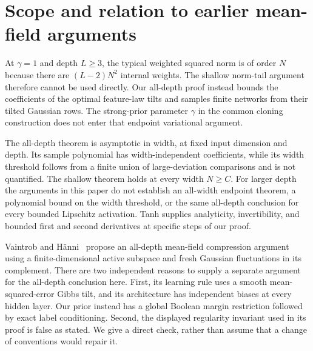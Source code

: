 \documentclass[11pt]{article}
\theoremstyle{remark}\newtheorem{remark}[theorem]{Remark}
\begin{document}
\section{Scope and relation to earlier mean-field arguments}
At $\gamma=1$ and depth $L\geq3$, the typical weighted squared norm is of
order $N$ because there are $(L-2)N^2$ internal weights. The shallow
norm-tail argument therefore cannot be used directly. Our all-depth proof
instead bounds the coefficients of the optimal feature-law tilts and samples
finite networks from their tilted Gaussian rows. The strong-prior parameter
$\gamma$ in the common cloning construction does not enter that endpoint
variational argument.

The all-depth theorem is asymptotic in width, at fixed input dimension and
depth. Its sample polynomial has width-independent coefficients, while its
width threshold follows from a finite union of large-deviation comparisons
and is not quantified. The shallow theorem holds at every width $N\geq C$.
For larger depth the arguments in this paper do not establish an all-width
endpoint theorem, a polynomial bound on the width threshold, or the same
all-depth conclusion for
every bounded Lipschitz activation. Tanh supplies analyticity, invertibility,
and bounded first and second derivatives at specific steps of our proof.

Vaintrob and H\"anni~\cite{mft} propose an all-depth mean-field compression
argument using a finite-dimensional active subspace and fresh Gaussian
fluctuations in its complement. There are two independent reasons to supply a separate argument
for the all-depth conclusion here. First,
its learning rule uses a smooth mean-squared-error Gibbs tilt, and its
architecture has independent biases at every hidden layer. Our prior instead
has a global Boolean margin restriction followed by exact label conditioning.
Second, the displayed regularity invariant used in its proof is false as
stated. We give a direct check, rather than assume that a change of conventions
would repair it.
\end{document}
